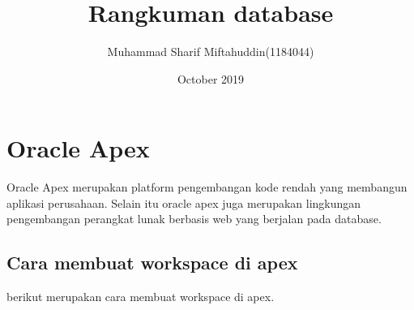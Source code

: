 \documentclass{article}
\title{Rangkuman database}
\author{Muhammad Sharif Miftahuddin(1184044) }
\date{October 2019}
\begin{document}
\maketitle

\section{Oracle Apex}
Oracle Apex merupakan platform pengembangan kode rendah yang membangun aplikasi perusahaan. Selain itu oracle apex juga merupakan lingkungan pengembangan perangkat lunak berbasis web yang berjalan pada database.

\subsection{Cara membuat workspace di apex}
berikut merupakan cara membuat workspace di apex.
\end{document}
